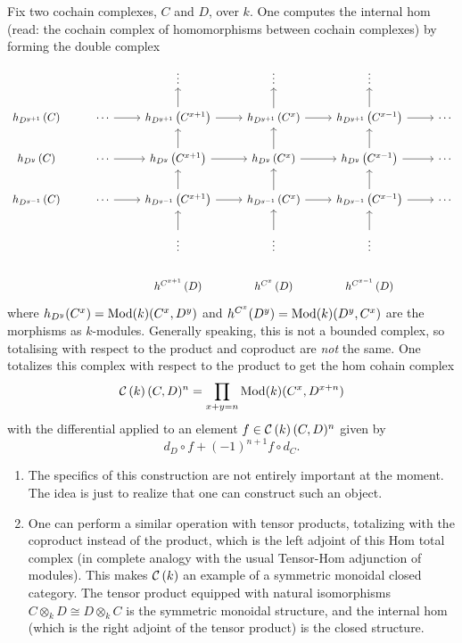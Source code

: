 \documentclass[reqno, 12pt]{amsart}
\begin{document}
\begin{exercise}
  Fix two cochain complexes, $C$ and $D$, over $k$.
  One computes the internal hom (read: the cochain complex of homomorphisms between cochain complexes) by forming the double complex
  $$\begin{tikzcd}
  & & \vdots & \vdots & \vdots\\
  h_{D^{y+1}}\left(C\right) & \cdots \arrow{r} & h_{D^{y+1}}\left(C^{x+1}\right)\arrow{u}\arrow{r} & h_{D^{y+1}}\left(C^x\right)\arrow{u}\arrow{r} & h_{D^{y+1}}\left(C^{x-1}\right) \arrow{u}\arrow{r} & \cdots\\
  h_{D^{y}}\left(C\right) & \cdots \arrow{r} & h_{D^{y}}\left(C^{x+1}\right)\arrow{u}\arrow{r} & h_{D^{y}}\left(C^x\right)\arrow{u}\arrow{r} & h_{D^{y}}\left(C^{x-1}\right) \arrow{u}\arrow{r} & \cdots\\
  h_{D^{y-1}}\left(C\right) & \cdots \arrow{r} & h_{D^{y-1}}\left(C^{x+1}\right)\arrow{u}\arrow{r} & h_{D^{y-1}}\left(C^x\right)\arrow{u}\arrow{r} & h_{D^{y-1}}\left(C^{x-1}\right) \arrow{u}\arrow{r} & \cdots\\
  & & \vdots\arrow{u} & \vdots\arrow{u} & \vdots\arrow{u}\\
  & & h^{C^{x+1}}\left(D\right) & h^{C^x}\left(D\right) & h^{C^{x-1}}\left(D\right)
  \end{tikzcd}$$
  where $h_{D^{y}}(C^x) = \operatorname{Mod}(k)(C^x, D^y)$ and $h^{C^x}(D^y) = \operatorname{Mod}(k)(D^y,C^x)$ are the morphisms as $k$-modules.
  Generally speaking, this is not a bounded complex, so totalising with respect to the product and coproduct are \emph{not} the same.
  One totalizes this complex with respect to the product to get the hom cohain complex
  $$\mathcal{C}\left(k\right)(C,D)^n = \prod_{x + y = n} \operatorname{Mod}(k)(C^x, D^{x+n})$$
  with the differential applied to an element $f \in \mathcal{C}\left(k\right)(C,D)^n$ given by
  $$d_D \circ f + (-1)^{n+1} f \circ d_C.$$
  \begin{remark}
    \noindent
    \begin{enumerate}
    \item
      The specifics of this construction are not entirely important at the moment.
      The idea is just to realize that one can construct such an object.
    \item
      One can perform a similar operation with tensor products, totalizing with the coproduct instead of the product, which is the left adjoint of this Hom total complex (in complete analogy with the usual Tensor-Hom adjunction of modules).
      This makes $\mathcal{C}\left(k\right)$ an example of a symmetric monoidal closed category.
      The tensor product equipped with natural isomorphisms $C \otimes_k D \cong D \otimes_k C$ is the symmetric monoidal structure, and the internal hom (which is the right adjoint of the tensor product) is the closed structure.

\end{enumerate}
\end{remark}
\end{exercise}
\end{document}
